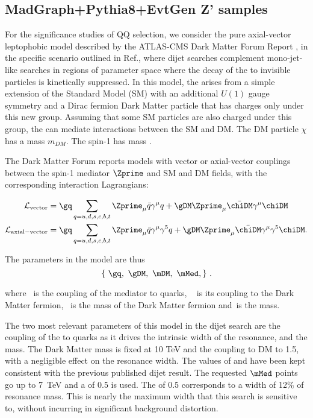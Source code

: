 
\subsection{MadGraph+Pythia8+EvtGen Z' samples}
\label{subsec:MCZprimeSamples}

For the significance studies of QQ selection, we consider the pure axial-vector
leptophobic \Zprime model described by the ATLAS-CMS Dark Matter Forum
Report \cite{Abercrombie:2015wmb}, in the specific scenario outlined in Ref.\cite{Chala:2015ama},
where dijet searches complement mono-jet-like searches in regions of
parameter space where the decay of the \Zprime to invisible particles is
kinetically suppressed.
%
In this model, the \Zprime arises from a simple extension of the Standard
Model (SM) with an additional $U(1)$ gauge symmetry and a Dirac
fermion Dark Matter particle that has charges only under this new
group. Assuming that some SM particles are also charged under this
group, the \Zprime can mediate interactions between the SM and DM. The DM
particle $\chi$ has a mass $m_{DM}$. The spin-1 \Zprime has mass \mMed.

The Dark Matter Forum reports models with vector or axial-vector couplings
between the spin-1 mediator $\Zprime$ and SM and DM fields, with the corresponding interaction Lagrangians:

\begin{align}
	\mathcal{L}_{\mathrm{vector}} &= \gq \sum_{q={u,d,s,c,b,t}}  \Zprime_{\mu} \bar{q}\gamma^{\mu}q + \gDM \Zprime_{\mu} \bar{\chiDM}\gamma^{\mu}\chiDM \\
	\mathcal{L}_{\mathrm{axial-vector}} &= \gq \sum_{q={u,d,s,c,b,t}}  \Zprime_{\mu} \bar{q}\gamma^{\mu}\gamma^5q + \gDM \Zprime_{\mu} \bar{\chiDM}\gamma^{\mu}\gamma^5\chiDM.
\end{align}

The parameters in the model are thus
\begin{equation}
\left\{~\gq,
~ \gDM,
~\mDM,
~\mMed,
\right\} \,.
\end{equation}

where ~\gq is the coupling of the \Zprime mediator to quarks, ~ \gDM
is its coupling to the Dark Matter fermion, ~\mDM is the mass
of the Dark Matter fermion and~\mMed is the \Zprime mass.

The two most relevant parameters of this model in the dijet search are the coupling of the \Zprime to quarks
as it drives the intrinsic width of the resonance, and the \Zprime mass. The Dark Matter mass is fixed at 10 TeV and the coupling to DM to 1.5, with
a negligible effect on the resonance width.
%
The values of \gq and \mMed have been kept consistent with the previous published dijet result.
The requested $\mMed$ points go up to 7~TeV and a \gq of 0.5 is used. The \gq of 0.5 corresponds to a width of 12\% of resonance mass. 
This is nearly the maximum width
that this search is sensitive to, without incurring in significant background distortion.

